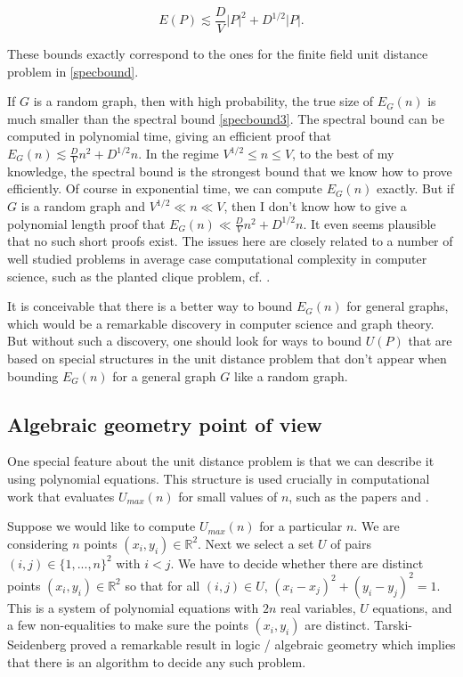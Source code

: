 \documentclass{amsart}
\newcommand{\RR}{\mathbb{R}}
\begin{document}
\begin{equation} \label{specbound3}
E(P) \lesssim \frac{D}{V}  |P|^2 + D^{1/2} |P|. 
\end{equation}

\noindent These bounds exactly correspond to the ones for the finite field unit distance problem in \eqref{specbound}.

If $G$ is a random graph, then with high probability, the true size of $E_G(n)$ is much smaller than the spectral bound \eqref{specbound3}.  The spectral bound can be computed in polynomial time, giving an efficient proof that $E_G(n) \lesssim \frac{D}{V} n^2 + D^{1/2} n$.   In the regime $V^{1/2} \le n \le V$,  to the best of my knowledge,  the spectral bound is the strongest bound that we know how to prove efficiently.  Of course in exponential time, we can compute $E_G(n)$ exactly.  But if $G$ is a random graph and $V^{1/2}  \ll n \ll V$, then I don't know how to give a polynomial length proof that $E_G(n) \ll  \frac{D}{V} n^2 + D^{1/2} n$.  It even seems plausible that no such short proofs exist.  The issues here are closely related to a number of well studied problems in average case computational complexity in computer science, such as the planted clique problem, cf.  \cite{BHKKMP}.

It is conceivable that there is a better way to bound $E_G(n)$ for general graphs, which would be a remarkable discovery in computer science and graph theory.   But without such a discovery,  one should look for ways to bound $U(P)$ that are based on special structures in the unit distance problem that don't appear when bounding $E_G(n)$ for a general graph $G$ like a random graph.


\subsection{Algebraic geometry point of view}

One special feature about the unit distance problem is that we can describe it using polynomial equations.  This structure is used crucially in computational work that evaluates $U_{max}(n)$ for small values of $n$, such as the papers \cite{Ale} and \cite{Eng}.

Suppose we would like to compute $U_{max}(n)$ for a particular $n$.  We are considering $n$ points $(x_i, y_i) \in \RR^2$.  Next we select a set $U$ of pairs $(i,j) \in \{1, ..., n\}^2$ with $i < j$.  We have to decide whether there are distinct points $(x_i, y_i) \in \RR^2$ so that for all $(i,j) \in U$, $(x_i - x_j)^2 + (y_i - y_j)^2 = 1$.  This is a system of polynomial equations with $2n$ real variables, $U$ equations, and a few non-equalities to make sure the points $(x_i, y_i)$ are distinct.  Tarski-Seidenberg proved a remarkable result in logic / algebraic geometry which implies that there is an algorithm to decide any such problem.
\end{document}
